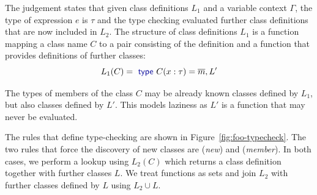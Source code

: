 \documentclass[a4paper,UKenglish]{lipics-v2016}
\theoremstyle{plain}
\theoremstyle{definition}
\newcommand{\kvd}[1]{\textnormal{\textcolor{kvdclr}{\sffamily #1}}}
\begin{document}
\noindent
The judgement states that given class definitions $L_1$ and a variable context $\Gamma$, the type
of expression $e$ is $\tau$ and the type checking evaluated further class definitions that are
now included in $L_2$. The structure of class definitions $L_1$ is a function mapping a class name 
$C$ to a pair consisting of the definition and a function that provides definitions of 
further classes: 
%
\begin{equation*}
L_1(C) = \kvd{type}~C(x:\tau) = \overline{m}, L'
\end{equation*}

\noindent
The types of members of the class $C$ may be already known classes defined by $L_1$, but also classes 
defined by $L'$. This models laziness as $L'$ is a function that may never be evaluated. 

The rules that define type-checking are shown in Figure~\ref{fig:foo-typecheck}. The two rules
that force the discovery of new classes are (\emph{new}) and (\emph{member}). In both cases,
we perform a lookup using $L_2(C)$ which returns a class definition together with further classes
$L$. We treat functions as sets and join $L_2$ with further classes defined by $L$ using $L_2 \cup L$.

\end{document}
